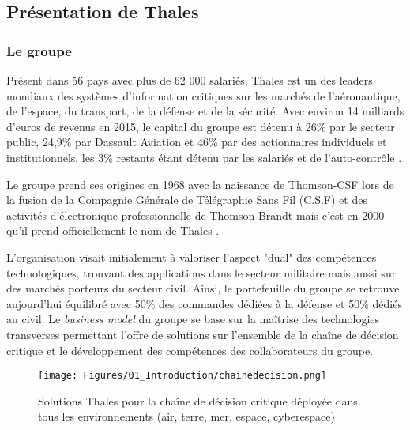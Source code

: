 \subsection{Présentation de Thales}
\subsubsection{Le groupe}
Présent dans 56 pays avec plus de 62 000 salariés, Thales est un des leaders mondiaux des systèmes d'information critiques sur les marchés de l'aéronautique, de l'espace, du transport, de la défense et de la sécurité. Avec environ 14 milliards d'euros de revenus en 2015, le capital du groupe est détenu à 26\% par le secteur public, 24,9\% par Dassault Aviation et 46\% par des actionnaires individuels et institutionnels, les 3\% restants étant détenu par les salariés et de l'auto-contrôle \cite{Thales:2016}.

Le groupe prend ses origines en 1968 avec la naissance de Thomson-CSF lors de la fusion de la Compagnie Générale de Télégraphie Sans Fil (C.S.F) et des activités d'électronique professionnelle de Thomson-Brandt mais c'est en 2000 qu'il prend officiellement le nom de Thales \cite{ThalesSite:2016}.

L'organisation visait initialement à valoriser l'aspect "dual" des compétences technologiques, trouvant des applications dans le secteur militaire mais aussi sur des marchés porteurs du secteur civil. Ainsi, le portefeuille du groupe se retrouve aujourd'hui équilibré avec 50\% des commandes dédiées à la défense et 50\% dédiés au civil. Le \textit{business model} du groupe se base sur la maîtrise des technologies transverses permettant l'offre de solutions sur l'ensemble de la chaîne de décision critique et le développement des compétences des collaborateurs du groupe.

\begin{figure}[H]
\centering
\texttt{[image: Figures/01\_Introduction/chainedecision.png]}
\caption{Solutions Thales pour la chaîne de décision critique déployée dans tous les environnements (air, terre, mer, espace, cyberespace)}
\end{figure}

